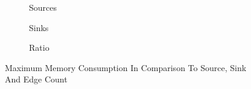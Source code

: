 \documentclass[../draft.tex]{subfiles}
\begin{document}
    \begin{figure}[tbp]
        \centering
        \begin{subfigure}[b]{\textwidth}
            \centering
            \begin{subfigure}[]{0.45\textwidth}
                \centering
                \resizebox{\columnwidth}{!}{
                    
                }
            \end{subfigure}
            \qquad
            \begin{subfigure}[]{0.45\textwidth}
                \centering
                \resizebox{\columnwidth}{!}{
                    
                }
            \end{subfigure}
            \caption{Sources}
        \end{subfigure}
        \bigbreak
        \begin{subfigure}[b]{\textwidth}
            \centering
            \begin{subfigure}[]{0.45\textwidth}
                \centering
                \resizebox{\columnwidth}{!}{
                    
                }
            \end{subfigure}
            \qquad
            \begin{subfigure}[]{0.45\textwidth}
                \centering
                \resizebox{\columnwidth}{!}{
                    
                }
            \end{subfigure}
            \caption{Sinks}
        \end{subfigure}
        \bigbreak
        \begin{subfigure}[b]{\textwidth}
            \centering
            \begin{subfigure}[]{0.45\textwidth}
                \centering
                \resizebox{\columnwidth}{!}{
                    
                }
            \end{subfigure}
            \qquad
            \begin{subfigure}[]{0.45\textwidth}
                \centering
                \resizebox{\columnwidth}{!}{
                    
                }
            \end{subfigure}
            \caption{Ratio}
        \end{subfigure}
        \caption{Maximum Memory Consumption In Comparison To Source, Sink And Edge Count}
        \label{f:maxmemtoss}
    \end{figure}
\end{document}
